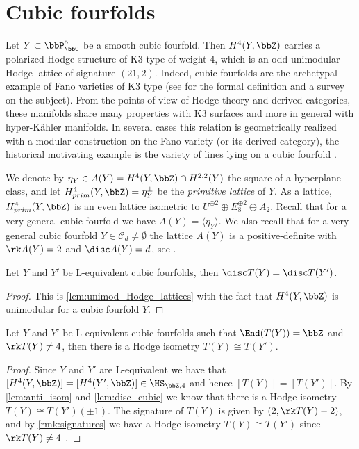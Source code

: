 \documentclass{amsart}
\begin{document}
\section{Cubic fourfolds}\label{sec:cubic fourfolds}
Let \(Y \subset \bbP^5_{\bbC}\) be a smooth cubic fourfold. Then \(H^4(Y,\bbZ)\) carries a polarized Hodge structure of K3 type of weight \(4\), which is an odd unimodular Hodge lattice of signature \((21,2)\). Indeed, cubic fourfolds are the archetypal example of Fano varieties of K3 type (see \cite{fatighenti2022topicsfanovarietiesk3} for the formal definition and a survey on the subject). From the points of view of Hodge theory and derived categories, these manifolds share many properties with K3 surfaces and more in general with hyper-Kähler manifolds. In several cases this relation is geometrically realized with a modular construction on the Fano variety (or its derived category), the historical motivating example is the variety of lines lying on a cubic fourfold \cite{beauville1985variete}. 

We denote by \(\eta_Y\in A(Y)=H^4(Y,\bbZ)\cap H^{2,2}(Y)\) the square of a hyperplane class, and let \(H^4_{prim}(Y,\bbZ)=\eta_Y^\perp \) be the \textit{primitive lattice} of \(Y\). As a lattice, \(H^4_{prim}(Y,\bbZ)\) is an even lattice isometric to \(U^{\oplus 2}\oplus E_8^{\oplus 2}\oplus A_2\). Recall that for a very general cubic fourfold we have \(A(Y)=\langle\eta_Y\rangle\). We also recall that for a very general cubic fourfold \(Y\in \mathcal{C}_d\not=\emptyset\) the lattice \(A(Y)\) is a positive-definite with \(\rk A(Y)=2\) and \(\disc A(Y)=d\), see \cite{hassett2000special}.
 
\begin{lemma}\label{lem:disc_cubic}
Let \(Y\) and \(Y'\) be L-equivalent cubic fourfolds, then \(\disc T(Y)=\disc T(Y')\).
\end{lemma}
\begin{proof}
    This is \autoref{lem:unimod_Hodge_lattices} with the fact that \(H^4(Y,\bbZ)\) is unimodular for a cubic fourfold \(Y\).
\end{proof}


\begin{lemma}\label{lem:Hodge_isometry_cubic}
    Let \(Y\) and \(Y'\) be L-equivalent cubic fourfolds such that \(\End(T(Y))=\bbZ\) and \(\rk T(Y)\not =  4\), then there is a Hodge isometry \(T(Y)\cong T(Y')\).
\end{lemma}
\begin{proof}
Since \(Y\) and \(Y'\) are L-equivalent we have that \([H^4(Y,\bbZ)]=[H^4(Y',\bbZ)]\in \HS_{\bbZ,4}\) and hence \([T(Y)]=[T(Y')]\). 
By \autoref{lem:anti_isom} and \autoref{lem:disc_cubic} we know that there is a Hodge isometry \(T(Y)\cong T(Y')(\pm1)\).
    The signature of \(T(Y)\) is given by \((2,\rk T(Y)-2)\), and by \autoref{rmk:signatures} we have a Hodge isometry \(T(Y)\cong T(Y')\) since \(\rk T(Y)\not = 4\) .
\end{proof}
\end{document}
